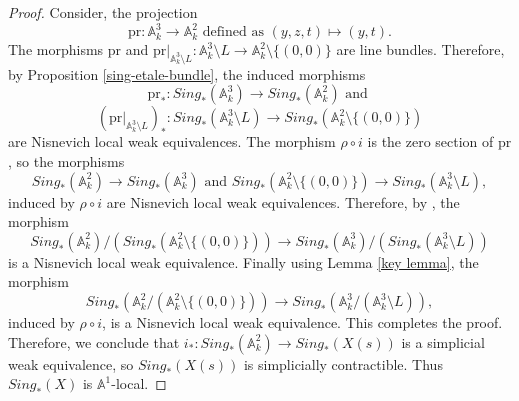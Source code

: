 \documentclass[11pt, reqno]{amsart}
\theoremstyle{plain}
\theoremstyle{definition}
\newcommand{\A}{{\mathbb A}}
\begin{document}
\begin{proof}
Consider, the projection
$$\text{pr}: \mathbb{A}^3_k \to \mathbb{A}^2_k \text{ defined as }(y,z,t) \mapsto (y,t).$$
The morphisms $\text{pr}$ and $\text{pr}|_{\mathbb{A}^3_k \setminus L}: \mathbb{A}^3_k \setminus L \to \mathbb{A}^2_k \setminus \{(0,0)\}$ are line bundles. Therefore, by Proposition \ref{sing-etale-bundle}, the induced morphisms
$$\text{pr}_*: Sing_*(\A^3_k) \to Sing_*(\A^2_k) \text{ and }$$ 
$$(\text{pr}|_{\mathbb{A}^3_k \setminus L})_*: Sing_*(\mathbb{A}^3_k \setminus L) \to Sing_*(\mathbb{A}^2_k \setminus \{(0,0)\})$$
are Nisnevich local weak equivalences. The morphism $\rho \circ i$ is the zero section of $\text{pr}$, so the morphisms
$$Sing_*(\A^2_k) \to Sing_*(\A^3_k) \text{ and }Sing_*(\A^2_k \setminus \{(0,0)\}) \to Sing_*(\A^3_k \setminus L),$$
induced by $\rho \circ i$ are Nisnevich local weak equivalences. Therefore, by \cite[Lemma 2.11, Section 2.2]{mv}, the morphism 
$$Sing_*(\A^2_k)/(Sing_*(\A^2_k \setminus \{(0,0)\})) \to Sing_*(\A^3_k)/(Sing_*(\A^3_k \setminus L))$$
is a Nisnevich local weak equivalence. Finally using Lemma \ref{key lemma}, the morphism
$$Sing_*(\mathbb{A}^2_k/(\mathbb{A}^2_k \setminus \{(0,0)\})) \to Sing_*(\mathbb{A}^3_k/(\mathbb{A}^3_k \setminus L)),$$
induced by $\rho \circ i$, is a Nisnevich local weak equivalence. This completes the proof. Therefore, we conclude that $i_*: Sing_*(\A^2_k) \to Sing_*(X(s))$ is a simplicial weak equivalence, so $Sing_*(X(s))$ is simplicially contractible. Thus $Sing_*(X)$ is $\A^1$-local.




\end{proof}
\end{document}
